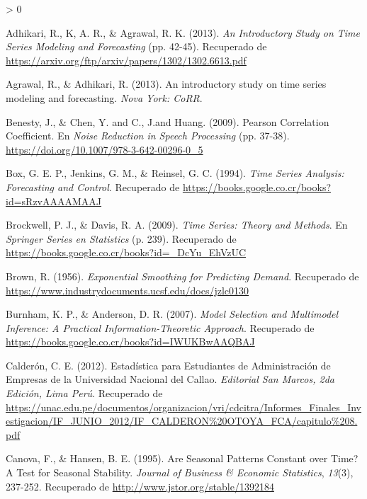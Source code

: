\documentclass[
]{article}
\newlength{\cslhangindent}
\newenvironment{CSLReferences}[2] %
 {%
  \setlength{\parindent}{0pt}
  \ifodd #1 \everypar{\setlength{\hangindent}{\cslhangindent}}\ignorespaces\fi
  \ifnum #2 > 0
  \setlength{\parskip}{#2\baselineskip}
  \fi
 }%
 {}
\begin{document}
\hypertarget{refs}{}
\begin{CSLReferences}{1}{0}
\leavevmode\hypertarget{ref-medidas}{}%
Adhikari, R., K, A. R., \& Agrawal, R. K. (2013). \emph{An Introductory
Study on Time Series Modeling and Forecasting} (pp. 42-45). Recuperado
de \url{https://arxiv.org/ftp/arxiv/papers/1302/1302.6613.pdf}

\leavevmode\hypertarget{ref-stationary_def}{}%
Agrawal, R., \& Adhikari, R. (2013). An introductory study on time
series modeling and forecasting. \emph{Nova York: CoRR}.

\leavevmode\hypertarget{ref-pearson}{}%
Benesty, J., \& Chen, Y. and C., J.and Huang. (2009). Pearson
Correlation Coefficient. En \emph{Noise Reduction in Speech Processing}
(pp. 37-38). \url{https://doi.org/10.1007/978-3-642-00296-0_5}

\leavevmode\hypertarget{ref-box-jenkins}{}%
Box, G. E. P., Jenkins, G. M., \& Reinsel, G. C. (1994). \emph{Time
Series Analysis: Forecasting and Control}. Recuperado de
\url{https://books.google.co.cr/books?id=sRzvAAAAMAAJ}

\leavevmode\hypertarget{ref-yule.walker}{}%
Brockwell, P. J., \& Davis, R. A. (2009). \emph{Time Series: Theory and
Methods}. En \emph{Springer Series en Statistics} (p. 239). Recuperado
de \url{https://books.google.co.cr/books?id=_DcYu_EhVzUC}

\leavevmode\hypertarget{ref-brown}{}%
Brown, R. (1956). \emph{Exponential Smoothing for Predicting Demand}.
Recuperado de \url{https://www.industrydocuments.ucsf.edu/docs/jzlc0130}

\leavevmode\hypertarget{ref-burnham2007model}{}%
Burnham, K. P., \& Anderson, D. R. (2007). \emph{Model Selection and
Multimodel Inference: A Practical Information-Theoretic Approach}.
Recuperado de \url{https://books.google.co.cr/books?id=IWUKBwAAQBAJ}

\leavevmode\hypertarget{ref-calderon2012estadistica}{}%
Calderón, C. E. (2012). Estadística para Estudiantes de Administración
de Empresas de la Universidad Nacional del Callao. \emph{Editorial San
Marcos, 2da Edición, Lima Perú}. Recuperado de
\url{https://unac.edu.pe/documentos/organizacion/vri/cdcitra/Informes_Finales_Investigacion/IF_JUNIO_2012/IF_CALDERON\%20OTOYA_FCA/capitulo\%208.pdf}

\leavevmode\hypertarget{ref-10.2307ux2f1392184}{}%
Canova, F., \& Hansen, B. E. (1995). Are Seasonal Patterns Constant over
Time? A Test for Seasonal Stability. \emph{Journal of Business \&
Economic Statistics}, \emph{13}(3), 237-252. Recuperado de
\url{http://www.jstor.org/stable/1392184}


\end{CSLReferences}
\end{document}
